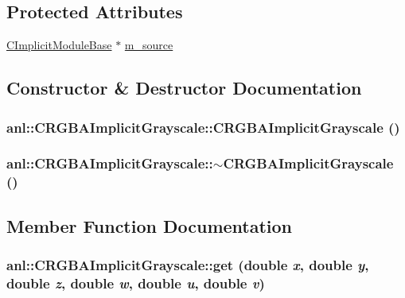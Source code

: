 \subsection*{Protected Attributes}
\begin{DoxyCompactItemize}
\item 
\hyperlink{classanl_1_1CImplicitModuleBase}{CImplicitModuleBase} $\ast$ \hyperlink{classanl_1_1CRGBAImplicitGrayscale_ab886a59904847ae8b7b9f4dc267e86e5}{m\_\-source}
\end{DoxyCompactItemize}


\subsection{Constructor \& Destructor Documentation}
\hypertarget{classanl_1_1CRGBAImplicitGrayscale_aa48e261575b605eee82c95e95f41d9ca}{
\subsubsection[{CRGBAImplicitGrayscale}]{\setlength{\rightskip}{0pt plus 5cm}anl::CRGBAImplicitGrayscale::CRGBAImplicitGrayscale ()}}
\label{classanl_1_1CRGBAImplicitGrayscale_aa48e261575b605eee82c95e95f41d9ca}
\hypertarget{classanl_1_1CRGBAImplicitGrayscale_a452b5faed032c0a952f030d46653f696}{
\subsubsection[{$\sim$CRGBAImplicitGrayscale}]{\setlength{\rightskip}{0pt plus 5cm}anl::CRGBAImplicitGrayscale::$\sim$CRGBAImplicitGrayscale ()}}
\label{classanl_1_1CRGBAImplicitGrayscale_a452b5faed032c0a952f030d46653f696}


\subsection{Member Function Documentation}
\hypertarget{classanl_1_1CRGBAImplicitGrayscale_a047141373ae0ae8f3bcafc8664301956}{
\subsubsection[{get}]{ anl::CRGBAImplicitGrayscale::get (double {\em x}, \/  double {\em y}, \/  double {\em z}, \/  double {\em w}, \/  double {\em u}, \/  double {\em v})}}
\label{classanl_1_1CRGBAImplicitGrayscale_a047141373ae0ae8f3bcafc8664301956}


